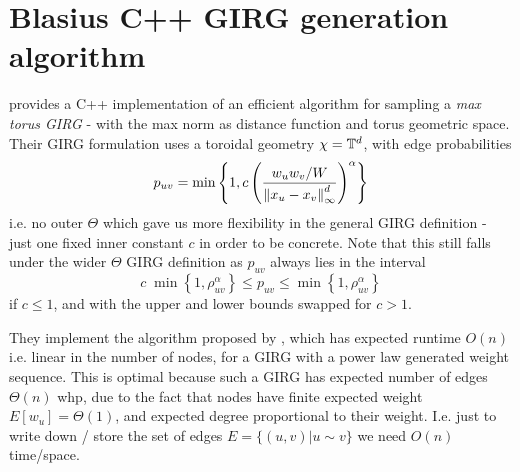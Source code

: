 \section{Blasius C++ GIRG generation algorithm}
\label{sec:blasius_cpp_generation}
\cite{blasius2022efficiently} provides a C++ implementation of an efficient algorithm for sampling a \textit{max torus GIRG} - with the max norm as distance function and torus geometric space.
Their GIRG formulation uses a toroidal geometry $\chi = \mathbb{T}^d$, with edge probabilities 
\begin{equation}
    p_{uv} = \min \left \{ 
        1,
        c \left (
            \frac{w_u w_v / W}{\left\lVert x_u - x_v\right\rVert_\infty^d}
        \right )^\alpha    
    \right \}
    \label{eq:blasius_GIRG_puv}
\end{equation}
i.e. no outer $\Theta$ which gave us more flexibility in the general GIRG definition - just one fixed inner constant $c$ in order to be concrete. 
Note that this still falls under the wider $\Theta$ GIRG definition 
as $p_{uv}$ always lies in the interval 
\begin{equation}
    c \; \min \left \{ 
        1,
        \rho_{uv}^\alpha
    \right \} \leq p_{uv} \leq \min \left \{ 
        1,
        \rho_{uv}^\alpha
    \right \}
\end{equation}
if $c \leq 1$, and with the upper and lower bounds swapped for $c > 1$.


They implement the algorithm proposed by \cite{bringmann2019geometric}, which has expected runtime $O(n)$ i.e. linear in the number of nodes, for a GIRG with a power law generated weight sequence.
This is optimal because such a GIRG has expected number of edges $\Theta(n)$ whp, due to the fact that nodes have finite expected weight $E[w_u] = \Theta(1)$, and expected degree proportional to their weight. I.e. just to write down / store the set of edges $E = \{(u, v) | u \sim v \}$ we need $O(n)$ time/space.

